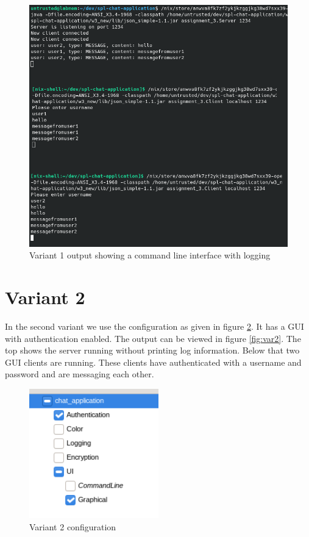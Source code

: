 \documentclass{article}
\begin{document}
\begin{figure}[!htbp]
    \centering
    \includegraphics[width=1.0\textwidth]{figures/variant1.png}
    \caption{Variant 1 output showing a command line interface with logging}
    \label{fig:var1}
\end{figure}

\section*{Variant 2}

In the second variant we use the configuration as given in figure \ref{fig:var2_config}. It has a GUI with authentication enabled. The output can be viewed in figure \ref{fig:var2}. The top shows the server running without printing log information. Below that two GUI clients are running. These clients have authenticated with a username and password and are messaging each other.

\begin{figure}[!htbp]
    \centering
    \includegraphics[width=0.5\textwidth]{figures/variant2_config.png}
    \caption{Variant 2 configuration}
    \label{fig:var2_config}
\end{figure}
\end{document}
